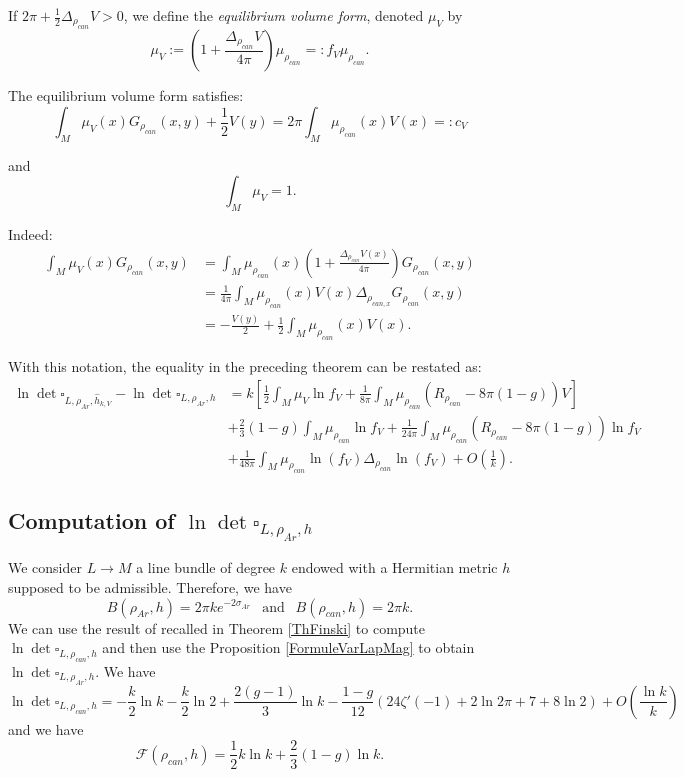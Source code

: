 \documentclass{article}
\theoremstyle{definition}
\theoremstyle{remark}
\begin{document}
If $2\pi+\frac{1}{2}\Delta_{\rho_{can}}V>0$, we define the \emph{equilibrium volume form}, denoted $\mu_{V}$ by \begin{equation}\label{MuV}\mu_{V}:=\left(1+\frac{\Delta_{\rho_{can}}V}{4\pi} \right)\mu_{\rho_{can}}=:f_{V}\mu_{\rho_{can}}.\end{equation}

The equilibrium volume form satisfies: $$\int_{M}\mu_{V}(x)G_{\rho_{can}}(x,y)+\frac{1}{2}V(y)=2\pi\int_{M}\mu_{\rho_{can}}(x)V(x)=:c_{V}$$

and $$\int_{M}\mu_{V}=1.$$

Indeed: \begin{align*}
    \int_{M}\mu_{V}(x)G_{\rho_{can}}(x,y)&=\int_{M}\mu_{\rho_{can}}(x)\left(1+\frac{\Delta_{\rho_{can}}V(x)}{4\pi} \right)G_{\rho_{can}}(x,y) \\&=\frac{1}{4\pi}\int_{M}\mu_{\rho_{can}}(x)V(x)\Delta_{\rho_{can,x}}G_{\rho_{can}}(x,y) \\&=-\frac{V(y)}{2}+\frac{1}{2}\int_{M}\mu_{\rho_{can}}(x)V(x).
\end{align*}

With this notation, the equality in the preceding theorem can be restated as: 
    \begin{align*}
    \ln \det\square_{L,\rho_{Ar},\hat{h}_{k,V}}-\ln\det\square_{L,\rho_{Ar},h}&=k\left[\frac{1}{2}\int_{M}\mu_{V}\ln f_{V}+\frac{1}{8\pi}\int_{M}\mu_{\rho_{can}}(R_{\rho_{can}}-8\pi(1-g))V \right]\\[1.5mm]&+\frac{2}{3}(1-g)\int_{M}\mu_{\rho_{can}}\ln f_{V} +\frac{1}{24\pi}\int_{M}\mu_{\rho_{can}}\left(R_{\rho_{can}}-8\pi(1-g) \right)\ln f_{V}\\[1.5mm]&+\frac{1}{48\pi}\int_{M}\mu_{\rho_{can}}\ln (f_{V})\Delta_{\rho_{can}}\ln \left(f_{V} \right)+O\left(\frac{1}{k} \right).
    \end{align*}

\subsection{Computation of $\ln\det\square_{L,\rho_{Ar},h}$}
We consider $L\to M$ a line bundle of degree $k$ endowed with a Hermitian metric $h$ supposed to be admissible. Therefore, we have $$B(\rho_{Ar},h)=2\pi k e^{-2\sigma_{Ar}} ~~ \text{ and } ~~ B(\rho_{can},h)=2\pi k.$$ We can use the result of recalled in Theorem \ref{ThFinski} to compute $\ln\det\square_{L,\rho_{can},h}$ and then use the Proposition \ref{FormuleVarLapMag} to obtain $\ln\det\square_{L,\rho_{Ar},h}.$ We have $$\ln \det \square_{L,\rho_{can},h}=-\frac{k}{2}\ln k-\frac{k}{2}\ln2 +\frac{2(g-1)}{3}\ln k - \frac{1-g}{12}(24\zeta'(-1)+2\ln2\pi+7+8\ln2)+O\left(\frac{\ln k}{k} \right)$$
and we have $$\mathcal{F}(\rho_{can},h)=\frac{1}{2}k\ln k +\frac{2}{3}(1-g)\ln k. $$
\end{document}

